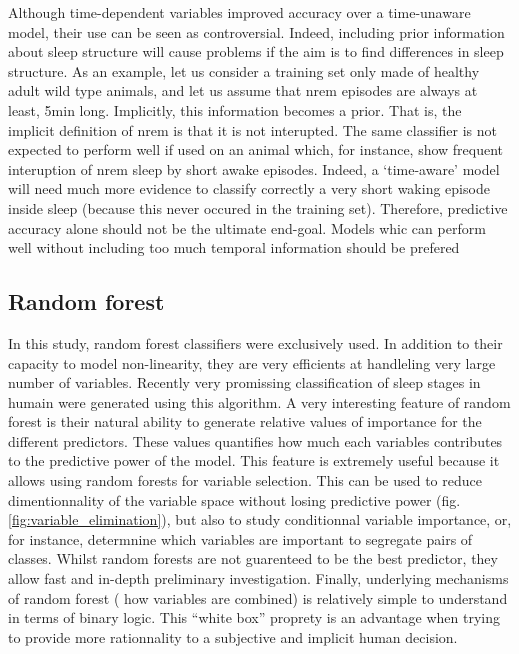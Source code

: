 Although time-dependent variables improved accuracy over a time-unaware model, their use can be seen as controversial.
Indeed, including prior information about sleep structure will cause problems if the aim is to find differences in sleep structure.
As an example, let us consider a training set only made of healthy adult wild type animals,
and let us assume that \gls{nrem} episodes are always at least, 5min long.
Implicitly, this information becomes a prior. That is, the implicit definition of \gls{nrem} is that it is not interupted.
The same classifier is not expected to perform well if used on an animal which, for instance, show frequent interuption of  \gls{nrem} sleep by short awake episodes.
Indeed, a `time-aware' model will need much more evidence to classify correctly a very short waking episode inside sleep (because this never occured in the training set).
Therefore, predictive accuracy alone should not be the ultimate end-goal. Models whic can perform well without including
too much temporal information should be prefered



\subsection{Random forest}

In this study, random forest\citationneeded{} classifiers were exclusively used.
In addition to their capacity to model non-linearity, they are very efficients at handleling very large number of variables. 
Recently very promissing classification of sleep stages in humain were generated using this algorithm\citationneeded{}.
A very interesting feature of random forest is their
natural ability to generate relative values of importance for the different predictors.
These values quantifies how much each variables contributes to the predictive power of the model.
This feature is extremely useful because it allows using random forests for variable selection.
This can be used to reduce dimentionnality of the variable space without losing predictive power (fig.\ref{fig:variable_elimination}),
but also to study conditionnal variable importance, or, for instance,
determnine which variables are important to segregate pairs of classes.
Whilst random forests are not guarenteed to be the best predictor, they allow fast and in-depth preliminary investigation.
Finally, underlying mechanisms of random forest (\ie{} how  variables are combined) is relatively simple to understand in terms of binary logic.
This ``white box'' proprety is an advantage when trying to provide more rationnality to a subjective and implicit human decision.



